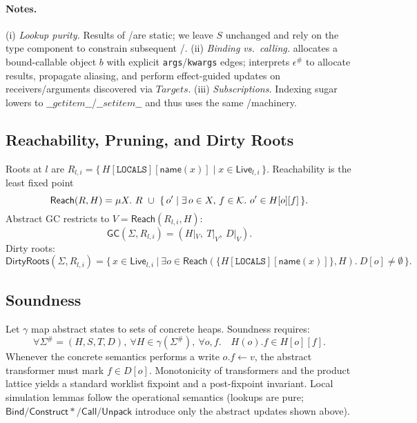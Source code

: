 \paragraph{Notes.}
(i) \emph{Lookup purity.} Results of \tLookupDunder/\tResolveOverload are static; we leave $S$ unchanged and rely on the type component to constrain subsequent \tBind/\tCall.
(ii) \emph{Binding vs.\ calling.} \tBind allocates a bound-callable object \(b\) with explicit \texttt{args}/\texttt{kwargs} edges; \tCall interprets \(\epsilon^\#\) to allocate results, propagate aliasing, and perform effect-guided updates on receivers/arguments discovered via \(Targets\).
(iii) \emph{Subscriptions.} Indexing sugar lowers to \(\_\_getitem\_\_\)/\(\_\_setitem\_\_\) and thus uses the same \tBind/\tCall machinery.

\subsection{Reachability, Pruning, and Dirty Roots}

Roots at \(l\) are
\(R_{l,i}=\{\,H[\mathtt{LOCALS}][\mathsf{name}(x)] \mid x\in \mathsf{Live}_{l,i}\,\}\).
Reachability is the least fixed point
\[
\mathsf{Reach}(R,H)=\mu X.\ R\ \cup\ \{\,o' \mid \exists\,o\in X,\, f\in\mathcal{K}.\ o'\in H[o][f] \,\}.
\]
Abstract GC restricts to \(V=\mathsf{Reach}(R_{l,i},H)\):
\[
\mathsf{GC}(\Sigma,R_{l,i})=(H|_V,\ T|_V,\ D|_V).
\]
Dirty roots:
\[
\mathsf{DirtyRoots}(\Sigma,R_{l,i})=\big\{\, x\in \mathsf{Live}_{l,i}\ \big|\ \exists o\in \mathsf{Reach}(\{H[\mathtt{LOCALS}][\mathsf{name}(x)]\},H).\ D[o]\neq \emptyset \,\big\}.
\]

\subsection{Soundness}

Let \(\gamma\) map abstract states to sets of concrete heaps. Soundness requires:
\[
\forall \Sigma^\#=(H,S,T,D),\ \forall H\in \gamma(\Sigma^\#),\ \forall o,f.\quad H(o).f \in H[o][f].
\]
Whenever the concrete semantics performs a write \(o.f\leftarrow v\), the abstract transformer must
mark \(f\in D[o]\). Monotonicity of transformers and the product lattice yields a standard
worklist fixpoint and a post-fixpoint invariant. Local simulation lemmas follow the \spytecode
operational semantics (lookups are pure; \(\mathsf{Bind}/\mathsf{Construct*}/\mathsf{Call}/\mathsf{Unpack}\) introduce only the abstract updates shown above).
